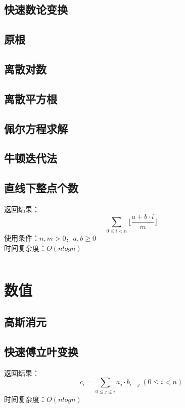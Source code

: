 \documentclass[a4paper]{article}
\newcommand{\cppcode}[1]{
    \inputminted[mathescape]{cpp}{source/#1}
}
\begin{document}
\subsection{快速数论变换}

\subsection{原根}

\subsection{离散对数}

\subsection{离散平方根}

\subsection{佩尔方程求解}

\subsection{牛顿迭代法}

\subsection{直线下整点个数}

返回结果：$$\sum_{0 \leq i < n} \lfloor \frac{a + b \cdot i}{m} \rfloor$$
\indent 使用条件：$n, m > 0$，$a, b \geq 0$\\
\indent 时间复杂度：$O(n log n)$

\cppcode{number-theory/lattice-count.cpp}

\section{数值}

\subsection{高斯消元}

\subsection{快速傅立叶变换}

返回结果：$$c_i=\sum_{0 \leq j \leq i} a_j \cdot b_{i-j} \ (0 \leq i < n)$$
\indent 时间复杂度：$O(n log n)$
\end{document}
